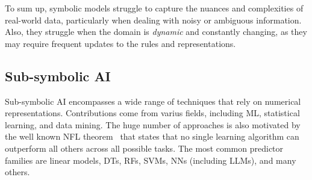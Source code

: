 To sum up, symbolic models struggle to capture the nuances and complexities of real-world data, particularly when dealing with noisy or ambiguous information.
%
Also, they struggle when the domain is \emph{dynamic} and constantly changing, as they may require frequent updates to the rules and representations.



\subsection[Sub-symbolic AI]{Sub-symbolic \Gls{AI}}\label{subsec:sub-symbolic-ai}
%
Sub-symbolic \gls{AI} encompasses a wide range of techniques that rely on numerical representations.
%
Contributions come from varius fields, including \gls{ML}, statistical learning, and data mining.
%
The huge number of approaches is also motivated by the well known \gls{NFL} theorem~\cite{DBLP:journals/tec/DolpertM97} that states that no single learning algorithm can outperform all others across all possible tasks.
%
The most common predictor families are linear models, \glspl{DT}, \glspl{RF}, \glspl{SVM}, \glspl{NN} (including \glspl{LLM}), and many others.


